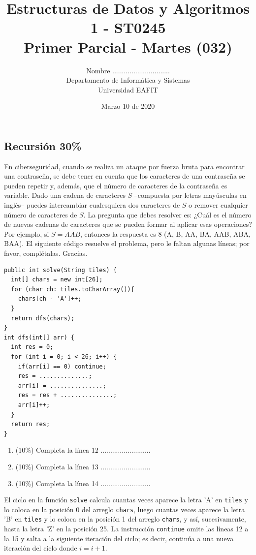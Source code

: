 \documentclass[10 pt]{article}
\title{\textbf {Estructuras de Datos y Algoritmos 1 - ST0245\\Primer Parcial - Martes (032)}}
\author{Nombre ..............................\\
		Departamento de Informática y Sistemas\\
		Universidad EAFIT\\}
\date{Marzo 10 de 2020}
\begin{document}
\lstset{escapechar=@,style=customc, numbers=left, stepnumber = 1} 
\maketitle
\begin{multicols}{2}

\section{Recursión 30\%}
En ciberseguridad, cuando se realiza un ataque por fuerza bruta para encontrar una contraseña, se debe tener en cuenta que los caracteres de una contraseña se pueden repetir y, además, que el número de caracteres de la contraseña es variable. 
Dado una cadena de caracteres $S$ --compuesta por letras mayúsculas en inglés-- puedes intercambiar cualesquiera dos caracteres de $S$ o remover cualquier número de caracteres de $S$.  La pregunta que debes resolver es: ¿Cuál es el número de nuevas cadenas de caracteres que se pueden formar al aplicar esas operaciones? Por ejemplo, si $S = AAB$, entonces la respuesta es 8 (A, B, AA, BA, AAB, ABA, BAA). El siguiente código resuelve el problema, pero le faltan algunas líneas; por favor, complétalas. Gracias.
{\small
\begin{lstlisting}
public int solve(String tiles) {
  int[] chars = new int[26];
  for (char ch: tiles.toCharArray()){
    chars[ch - 'A']++;
  }
  return dfs(chars);
}
int dfs(int[] arr) {
  int res = 0;
  for (int i = 0; i < 26; i++) {
    if(arr[i] == 0) continue;
    res = ..............;
    arr[i] = ...............;
    res = res + ...............;
    arr[i]++;
  }
  return res;
}
\end{lstlisting}
}
\begin{enumerate}[label=\Alph*]
	\item (10\%) Completa la línea 12 ..........................
	\item (10\%) Completa la línea 13 ..........................
	\item (10\%) Completa la línea 14
	..........................
\end{enumerate}

El ciclo en la función \texttt{solve} calcula cuantas veces aparece la letra 'A' en \texttt{tiles} y lo coloca en la posición 0 del arreglo \texttt{chars},
luego cuantas veces aparece la letra 'B' en \texttt{tiles} y lo coloca en la posición 1 del arreglo \texttt{chars}, y así, sucesivamente, hasta la letra 'Z' en la posición 25. La instrucción \texttt{continue} omite las líneas 12 a la 15 y salta a la siguiente iteración del ciclo; es decir, continúa a una nueva iteración del ciclo donde $i=i+1$.


\end{multicols}
\end{document}
